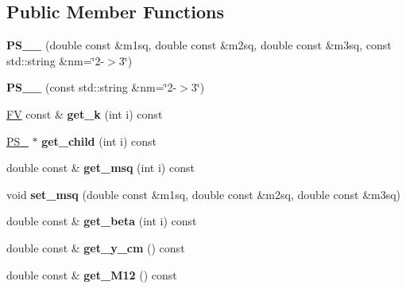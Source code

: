 \subsection*{Public Member Functions}
\begin{DoxyCompactItemize}
\item 
\hypertarget{classPS__2__3_ab8f2664ecfc751cc67758877b1faaf1a}{{\bfseries P\-S\-\_\-\_} (double const \&m1sq, double const \&m2sq, double const \&m3sq, const std\-::string \&nm=\char`\"{}2-\/$>$3\char`\"{})}\label{classPS__2__3_ab8f2664ecfc751cc67758877b1faaf1a}

\item 
\hypertarget{classPS__2__3_a70c48a6882d721f7bbd4303fc435f0ef}{{\bfseries P\-S\-\_\-\_} (const std\-::string \&nm=\char`\"{}2-\/$>$3\char`\"{})}\label{classPS__2__3_a70c48a6882d721f7bbd4303fc435f0ef}

\item 
\hypertarget{classPS__2__3_ad94c48b0f0f0d85a9fe2eda8ab86ed4c}{\hyperlink{classFV}{F\-V} const \& {\bfseries get\-\_\-k} (int i) const }\label{classPS__2__3_ad94c48b0f0f0d85a9fe2eda8ab86ed4c}

\item 
\hypertarget{classPS__2__3_a60f08c495bc4adb2c7cd172ffb5a5ee8}{\hyperlink{classPS__2}{P\-S\-\_} $\ast$ {\bfseries get\-\_\-child} (int i) const }\label{classPS__2__3_a60f08c495bc4adb2c7cd172ffb5a5ee8}

\item 
\hypertarget{classPS__2__3_a4d60a9ea4e6348616b9f5359b151dac7}{double const \& {\bfseries get\-\_\-msq} (int i) const }\label{classPS__2__3_a4d60a9ea4e6348616b9f5359b151dac7}

\item 
\hypertarget{classPS__2__3_a25fc55beb243e18d8edfabdae7aa1d47}{void {\bfseries set\-\_\-msq} (double const \&m1sq, double const \&m2sq, double const \&m3sq)}\label{classPS__2__3_a25fc55beb243e18d8edfabdae7aa1d47}

\item 
\hypertarget{classPS__2__3_a859deb3d64ac6964a74a6d395d665b03}{double const \& {\bfseries get\-\_\-beta} (int i) const }\label{classPS__2__3_a859deb3d64ac6964a74a6d395d665b03}

\item 
\hypertarget{classPS__2__3_ab8b97616752d6c90ae43b3e5433dfb9c}{double const \& {\bfseries get\-\_\-y\-\_\-cm} () const }\label{classPS__2__3_ab8b97616752d6c90ae43b3e5433dfb9c}

\item 
\hypertarget{classPS__2__3_a064b972db40cb6ac0bb77232dbc31a84}{double const \& {\bfseries get\-\_\-\-M12} () const }\label{classPS__2__3_a064b972db40cb6ac0bb77232dbc31a84}


\end{DoxyCompactItemize}
